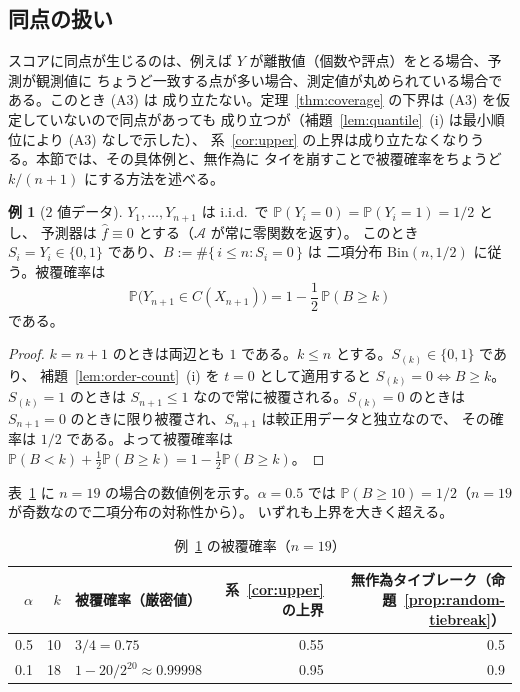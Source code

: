 \documentclass[a4paper,11pt]{jsarticle}
\theoremstyle{definition}
\newtheorem{example}[definition]{例}
\theoremstyle{plain}
\theoremstyle{remark}
\newcommand{\Prob}{\mathbb{P}}
\newcommand{\fhat}{\hat{f}}
\begin{document}
\subsection{同点の扱い}
\label{sec:ties}

スコアに同点が生じるのは、例えば $Y$ が離散値（個数や評点）をとる場合、予測が観測値に
ちょうど一致する点が多い場合、測定値が丸められている場合である。このとき (A3) は
成り立たない。定理~\ref{thm:coverage} の下界は (A3) を仮定していないので同点があっても
成り立つが（補題~\ref{lem:quantile}~(i) は最小順位により (A3) なしで示した）、
系~\ref{cor:upper} の上界は成り立たなくなりうる。本節では、その具体例と、無作為に
タイを崩すことで被覆確率をちょうど $k/(n+1)$ にする方法を述べる。

\begin{example}[$2$ 値データ]
  \label{ex:binary}
  $Y_1,\dots,Y_{n+1}$ は i.i.d.\ で $\Prob(Y_i=0)=\Prob(Y_i=1)=1/2$ とし、
  予測器は $\fhat\equiv0$ とする（$\mathcal{A}$ が常に零関数を返す）。
  このとき $S_i=Y_i\in\{0,1\}$ であり、$B:=\#\{\,i\le n: S_i=0\,\}$ は
  二項分布 $\mathrm{Bin}(n,1/2)$ に従う。被覆確率は
  \begin{equation}
    \label{eq:binary-coverage}
    \Prob\bigl(Y_{n+1}\in C(X_{n+1})\bigr)=1-\frac12\,\Prob(B\ge k)
  \end{equation}
  である。
\end{example}

\begin{proof}
  $k=n+1$ のときは両辺とも $1$ である。$k\le n$ とする。$S_{(k)}\in\{0,1\}$ であり、
  補題~\ref{lem:order-count}~(i) を $t=0$ として適用すると $S_{(k)}=0\iff B\ge k$。
  $S_{(k)}=1$ のときは $S_{n+1}\le1$ なので常に被覆される。$S_{(k)}=0$ のときは
  $S_{n+1}=0$ のときに限り被覆され、$S_{n+1}$ は較正用データと独立なので、
  その確率は $1/2$ である。よって被覆確率は
  $\Prob(B<k)+\frac12\Prob(B\ge k)=1-\frac12\Prob(B\ge k)$。
\end{proof}

表~\ref{tab:binary} に $n=19$ の場合の数値例を示す。$\alpha=0.5$ では
$\Prob(B\ge10)=1/2$（$n=19$ が奇数なので二項分布の対称性から）。
いずれも上界を大きく超える。

\begin{table}[htbp]
  \centering
  \caption{例~\ref{ex:binary} の被覆確率（$n=19$）}
  \label{tab:binary}
  \begin{tabular}{rrlrr}
    \toprule
    $\alpha$ & $k$ & 被覆確率（厳密値） & 系~\ref{cor:upper} の上界
      & 無作為タイブレーク（命題~\ref{prop:random-tiebreak}） \\
    \midrule
    0.5 & 10 & $3/4=0.75$ & 0.55 & 0.5 \\
    0.1 & 18 & $1-20/2^{20}\approx0.99998$ & 0.95 & 0.9 \\
    \bottomrule
  \end{tabular}
\end{table}
\end{document}
